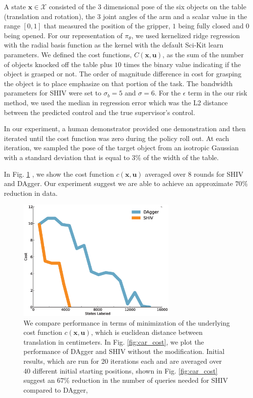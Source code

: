 \documentclass[10pt, conference]{ieeeconf}      %
\newcommand{\bu}{\mathbf{u}}
\newcommand{\bx}{\mathbf{x}}
\begin{document}
A state $\bx\in \mathcal{X}$ consisted of the 3 dimensional pose of the six objects on the table (translation and rotation), the 3 joint angles of the arm and a scalar value in the range $[0,1]$ that measured the position of the gripper, $1$ being fully closed and $0$ being opened. For our representation of $\pi_{\theta}$, we used kernelized ridge regression with the radial basis function as the kernel with the default Sci-Kit learn parameters. We defined the cost functions, $C(\bx,\bu)$, as the sum of the number of objects knocked off the table plus $10$ times the binary value indicating if the object is grasped or not. The order of magnitude difference in cost for grasping the object is to place emphasize on that portion of the task. The bandwidth parameters for SHIV were set to $\sigma_b = 5$ and $\sigma = 6$. For the $\epsilon$ term in the our risk method, we used the median in regression error which was the L2 distance between the predicted control and the true supervisor's control. 

In our experiment, a human demonstrator provided one demonstration and then iterated until the cost function was zero during the policy roll out. At each iteration, we sampled the pose of the target object from an isotropic Gaussian with a standard deviation that is equal to $3\%$ of the width of the table. 

In Fig. \ref{fig:grasp_cost} , we show the cost function $c(\bx,\bu)$ averaged over 8 rounds for SHIV and DAgger.
Our experiment suggest we are able to achieve an approximate $70\%$ reduction in data. 

\begin{figure}[t!]
\centering
\includegraphics[width=\columnwidth, height=6cm]{figures/grasp_clutter.eps}
\caption{We compare performance in terms of minimization of the underlying cost function $c(\bx,\bu)$, which is euclidean distance between translation in centimeters. In Fig. \ref{fig:car_cost}, we plot the performance of DAgger and SHIV without the modification.  Initial results, which are run for 20 iterations each and are averaged over 40 different initial starting positions, shown in Fig. \ref{fig:car_cost} suggest an $67\%$ reduction in the number of queries needed for SHIV compared to DAgger,}
\vspace*{-10pt}
\label{fig:grasp_cost}
\end{figure}
\end{document}
